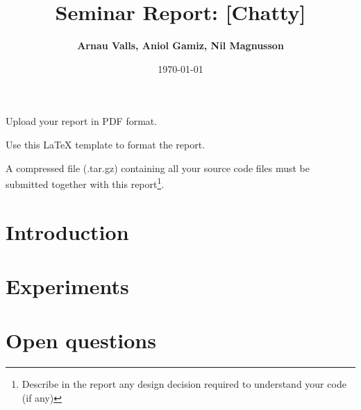 \documentclass[a4paper, 10pt]{article}
\title{Seminar Report: [Chatty]}
\author{\textbf{Arnau Valls, Aniol Gamiz, Nil Magnusson}}
\date{\normalsize\today{}}
\begin{document}
\maketitle

\begin{center}
  Upload your report in PDF format.
  
  Use this LaTeX template to format the report.
  
	A compressed file (.tar.gz) containing all your source code files must be submitted together with this report\footnote{Describe in the report any design decision required to understand your code (if any)}.
\end{center}



\section{Introduction}

\begin{itemize}



\end{itemize}

\section{Experiments}

\begin{itemize}

\text{}

\end{itemize}

\newpage

\section{Open questions}
\end{document}
